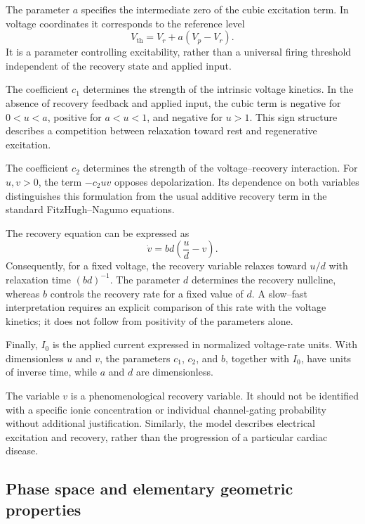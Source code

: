 \documentclass[11pt,reqno]{amsart}
\theoremstyle{plain}
\theoremstyle{definition}
\theoremstyle{remark}
\begin{document}
The parameter $a$ specifies the intermediate zero of the
cubic excitation term. In voltage coordinates it corresponds
to the reference level
\[
V_{\mathrm{th}}=V_r+a(V_p-V_r).
\]
It is a parameter controlling excitability, rather than a
universal firing threshold independent of the recovery
state and applied input.

The coefficient $c_1$ determines the strength of the intrinsic
voltage kinetics. In the absence of recovery feedback and
applied input, the cubic term is negative for $0<u<a$,
positive for $a<u<1$, and negative for $u>1$. This sign
structure describes a competition between relaxation
toward rest and regenerative excitation.

The coefficient $c_2$ determines the strength of the
voltage--recovery interaction. For $u,v>0$, the term
$-c_2uv$ opposes depolarization. Its dependence on both
variables distinguishes this formulation from the usual
additive recovery term in the standard FitzHugh--Nagumo
equations.

The recovery equation can be expressed as
\begin{equation}
\label{eq:recovery-relaxation}
\dot v=bd\left(\frac{u}{d}-v\right).
\end{equation}
Consequently, for a fixed voltage, the recovery variable
relaxes toward $u/d$ with relaxation time $(bd)^{-1}$.
The parameter $d$ determines the recovery nullcline,
whereas $b$ controls the recovery rate for a fixed value
of $d$. A slow--fast interpretation requires an explicit
comparison of this rate with the voltage kinetics; it
does not follow from positivity of the parameters alone.

Finally, $I_0$ is the applied current expressed in normalized
voltage-rate units. With dimensionless $u$ and $v$, the
parameters $c_1$, $c_2$, and $b$, together with $I_0$,
have units of inverse time, while $a$ and $d$ are
dimensionless.

The variable $v$ is a phenomenological recovery variable.
It should not be identified with a specific ionic
concentration or individual channel-gating probability
without additional justification. Similarly, the model
describes electrical excitation and recovery, rather
than the progression of a particular cardiac disease.

\subsection{Phase space and elementary geometric properties}
\label{subsec:phase-space}
\end{document}
